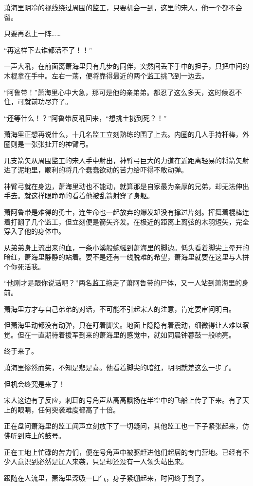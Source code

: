 萧海里阴冷的视线绕过周围的监工，只要机会一到，这里的宋人，他一个都不会留。

只要再忍上一阵……

“再这样下去谁都活不了！！”

一声大吼，在前面离萧海里只有几步的同伴，突然间丢下手中的担子，只把中间的木棍拿在手中。左右一荡，便将靠得最近的两个监工挑飞到一边去。

“阿鲁带！”萧海里心中大急，那可是他的亲弟弟。都忍了这么多天，这时候忍不住，可就前功尽弃了。

“还等什么！？”阿鲁带反吼回来，“想挑土挑到死？！”

萧海里正想再说什么，十几名监工立刻熟练的围了上去。内圈的几人手持杆棒，外圈则是一张张扯开的神臂弓。

几支箭矢从周围监工的宋人手中射出，神臂弓巨大的力道在近距离轻易的将箭矢射进了泥地里，顺利的将几个蠢蠢欲动的苦力给吓得不敢动弹。

神臂弓就在身边，萧海里动也不能动，就算那是自家最为亲厚的兄弟，却无法伸出手去。就这样眼睁睁的看着他被乱箭射穿了身躯。

萧阿鲁带是难得的勇士，连生命也一起放弃的爆发却没有撑过片刻。挥舞着棍棒连着打翻了几个监工，但立刻便是箭矢齐发。在极近的距离上离弦的木羽短矢，完全穿入了他的身体中。

从弟弟身上流出来的血，一条小溪般蜿蜒到萧海里的脚边。低头看着脚尖上晕开的暗红，萧海里静静的站着。要不是还有一线脱难的希望，萧海里就要在这里与人拼个你死活我。

“他刚才是跟你说话吧？”两名监工拖走了萧阿鲁带的尸体，又一人站到萧海里的身前。

萧海里方才与自己弟弟的对话，不可能不引起宋人的注意，肯定要审问明白。

但萧海里动都没有动弹，只在盯着脚尖。地面上隐隐有着震动，细微得让人难以察觉。但在一直期待着援军到来的萧海里的感觉中，就如同晨钟暮鼓一般响亮。

终于来了。

萧海里惨然而笑，不知是悲是喜。他看着脚尖的暗红，明明就差这么一步了。

但机会终究是来了！

宋人这边有了反应，刺耳的号角声从高高飘扬在半空中的飞船上传了下来。有了天上的眼睛，任何突袭难度都高了十倍。

正在盘问萧海里的监工闻声立刻放下了一切疑问，其他监工也一下子紧张起来，仿佛听到阵上的鼓号。

正在工地上忙碌的苦力们，便在号角声中被驱赶进他们起居的专门营地。已经有不少人意识到必然是辽人来袭，只是却还没有一人领头站出来。

跟随在人流里，萧海里深吸一口气，身子紧绷起来，时间终于到了。

